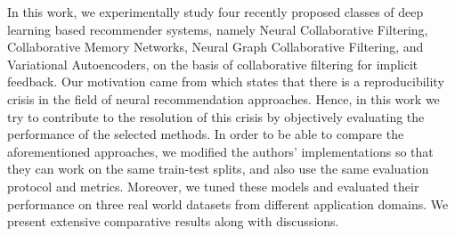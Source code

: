 In this work, we experimentally study four recently proposed classes of deep learning based recommender systems, namely Neural Collaborative Filtering, Collaborative Memory Networks, Neural Graph Collaborative Filtering, and Variational Autoencoders, on the basis of collaborative filtering for implicit feedback.
Our motivation came from \cite{dacrema2019we} which states that there is a reproducibility crisis in the field of neural recommendation approaches.
Hence, in this work we try to contribute to the resolution of this crisis by objectively evaluating the performance of the selected methods.
In order to be able to compare the aforementioned approaches, we modified the authors' implementations so that they can work on the same train-test splits, and also use the same evaluation protocol and metrics.
Moreover, we tuned these models and evaluated their performance on three real world datasets from different application domains.
We present extensive comparative results along with discussions.
